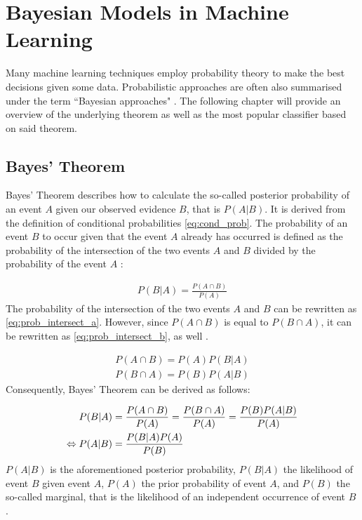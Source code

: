 \chapter{Bayesian Models in Machine Learning}

Many machine learning techniques employ probability theory to make the best decisions given some data. Probabilistic approaches are often also summarised under the term ``Bayesian approaches" \citep{Murphy2012}. The following chapter will provide an overview of the underlying theorem as well as the most popular classifier based on said theorem.

\section{Bayes’ Theorem} \label{sec:bayes_theorem}

Bayes' Theorem describes how to calculate the so-called posterior probability of an event $A$ given our observed evidence $B$, that is $P(A|B)$. It is derived from the definition of conditional probabilities \eqref{eq:cond_prob}. The probability of an event $B$ to occur given that the event $A$ already has occurred is defined as the probability of the intersection of the two events $A$ and $B$ divided by the probability of the event $A$ \citep{Murphy2012}:

\begin{gather}
    P(B|A) = \frac{P(A \cap B)}{P(A)} \label{eq:cond_prob}
\end{gather}
The probability of the intersection of the two events $A$ and $B$ can be rewritten as \eqref{eq:prob_intersect_a}. However, since $P(A \cap B)$ is equal to $P(B \cap A)$, it can be rewritten as \eqref{eq:prob_intersect_b}, as well \citep{Manning2009}. 

\begin{gather}
    P(A \cap B) = P(A) P(B|A) \label{eq:prob_intersect_a}
\end{gather}
\begin{gather}
    P(B \cap A) = P(B) P(A|B) \label{eq:prob_intersect_b}
\end{gather}
Consequently, Bayes' Theorem can be derived as follows:


\begin{align}
    P(B|A)  &= \frac{P(A \cap B)}{P(A)}
           = \frac{P(B \cap A)}{P(A)}
            = \frac{P(B) P(A|B)}{P(A)} \notag\\
    \Leftrightarrow P(A|B) &= \frac{P(B|A) P(A)}{P(B)} \label{eq:BT_derived}
\end{align}
$P(A|B)$ is the aforementioned posterior probability, $P(B|A)$ the likelihood of event $B$ given event $A$, $P(A)$ the prior probability of event $A$, and $P(B)$ the so-called marginal, that is the likelihood of an independent occurrence of event $B$ \citep{Manning2009, Rijsbergen1979}.


